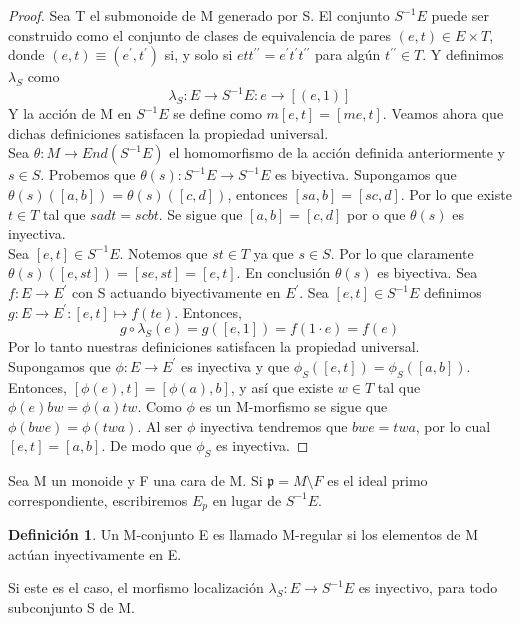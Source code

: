 \documentclass[12pt,spanish]{amsart}
\newcommand{\fk}[1]{\mathfrak{#1}}
\theoremstyle{definition}
\newtheorem{Def}[Theorem]{Definición}
\theoremstyle{remark}
\begin{document}
\begin{proof}
Sea T el submonoide de M generado por S. El conjunto $S^{-1}E$ puede ser construido como el conjunto de clases de equivalencia de pares $(e,t)\in E\times T$, donde $(e,t)\equiv (e^{\prime},t^{\prime})$ si, y solo si $ett^{\prime \prime}=e^{\prime}t^{\prime}t^{\prime \prime}$ para algún $t^{\prime \prime}\in T$. Y definimos $\lambda_{S}$ como
$$\lambda_{S}: E \to S^{-1}E:e \to [(e,1)]$$
Y la acción de M en $S^{-1}E$ se define como $m[e,t]=[me,t]$. Veamos ahora que dichas definiciones satisfacen la propiedad universal. \\
Sea $\theta: M \to End(S^{-1}E)$ el homomorfismo de la acción definida anteriormente y $s\in S$. Probemos que $\theta(s):S^{-1}E \to S^{-1}E$ es biyectiva. Supongamos que $\theta(s)([a,b])=\theta(s)([c,d])$, entonces $[sa,b]=[sc,d]$. Por lo que existe $t\in T$ tal que $sadt=scbt$. Se sigue que $[a,b]=[c,d]$ por o que $\theta(s)$ es inyectiva. \\
Sea $[e,t]\in S^{-1}E$. Notemos que $st\in T$ ya que $s\in S$. Por lo que claramente $\theta(s)([e,st])=[se,st]=[e,t]$. En conclusión $\theta(s)$ es biyectiva. Sea $f:E\to E^{\prime}$ con S actuando biyectivamente en $E^{\prime}$. Sea $[e,t]\in S^{-1}E$ definimos $g:E \to E^{\prime}:[e,t]\mapsto f(te)$. Entonces,
$$g \circ \lambda_{S}(e)=g([e,1])=f(1\cdot e)=f(e)$$
Por lo tanto nuestras definiciones satisfacen la propiedad universal. \\ 
Supongamos que $\phi:E \to E^{\prime}$ es inyectiva y que $\phi_{S}([e,t])=\phi_{S}([a,b])$. Entonces, $[\phi(e),t]=[\phi(a),b]$, y así que existe $w\in T$ tal que $\phi(e)bw=\phi(a)tw$. Como $\phi$ es un M-morfismo se sigue que $\phi(bwe)=\phi(twa)$. Al ser $\phi$ inyectiva tendremos que $bwe=twa$, por lo cual $[e,t]=[a,b]$. De modo que $\phi_{S}$ es inyectiva.   
\end{proof}

Sea M un monoide y F una cara de M. Si $\fk{p} = M \setminus F$ es el ideal primo correspondiente, escribiremos $E_{p}$ en lugar de $S^{-1}E$. 

\begin{Def}
Un M-conjunto E es llamado M-regular si los elementos de M actúan inyectivamente en E. 
\end{Def}

Si este es el caso, el morfismo localización $\lambda_{S}:E \to S^{-1}E$ es inyectivo, para todo subconjunto S de M. \\
\end{document}

